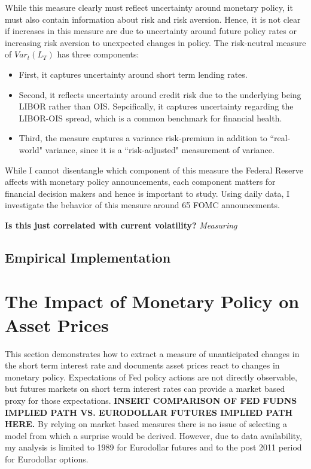 \documentclass[11pt]{article}
\begin{document}
While this measure clearly must reflect uncertainty around monetary policy, it must also contain information about risk and risk aversion. Hence, it is not clear if increases in this measure are due to uncertainty around future policy rates or increasing risk aversion to unexpected changes in policy. 
The risk-neutral measure of $Var_{t}(L_{T})$ has three components:
\begin{itemize}
	\item First, it captures uncertainty around short term lending rates. 
	\item Second, it reflects uncertainty around credit risk due to the underlying being LIBOR rather than OIS. Sepcifically, it captures uncertainty regarding the LIBOR-OIS spread, which is a common benchmark for financial health.  
	\item Third, the measure captures a variance risk-premium in addition to ``real-world" variance, since it is a ``risk-adjusted" measurement of variance. 
\end{itemize}
While I cannot disentangle which component of this measure the Federal Reserve affects with monetary policy announcements, each component matters for financial decision makers and hence is important to study.  Using daily data, I investigate the behavior of this measure around 65 FOMC announcements.  


\textbf{Is this just correlated with current volatility?}
\textit{Measuring }
\subsection{Empirical Implementation}


\section{The Impact of Monetary Policy on Asset Prices}
This section demonstrates how to extract a measure of unanticipated changes in the short term interest rate and documents asset prices react to changes in monetary policy. Expectations of Fed policy actions are not directly observable, but futures markets on short term interest rates can provide a market based proxy for those expectations. \textbf{INSERT COMPARISON OF FED FUDNS IMPLIED PATH VS. EURODOLLAR FUTURES IMPLIED PATH HERE. } By relying on market based measures there is no issue of selecting a model from which a surprise would be derived. However, due to data availability, my analysis is limited to 1989 for Eurodollar futures and to the post 2011 period for Eurodollar options.
\end{document}
